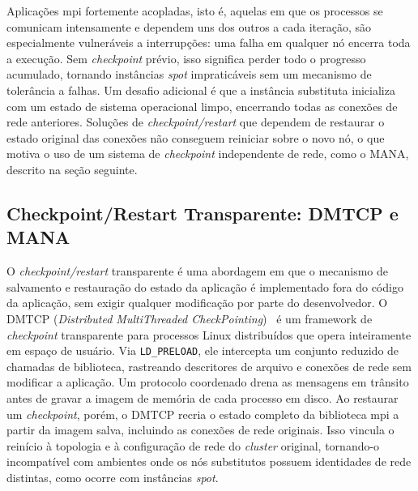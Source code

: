 \documentclass[a4paper,11pt]{article}
\begin{document}
            Aplicações \gls{mpi} fortemente acopladas, isto é, aquelas em que os processos
            se comunicam intensamente e dependem uns dos outros a cada iteração, são
            especialmente vulneráveis a interrupções: uma falha em qualquer nó encerra
            toda a execução. Sem \textit{checkpoint} prévio, isso significa perder todo
            o progresso acumulado, tornando instâncias \textit{spot} impraticáveis sem
            um mecanismo de tolerância a falhas. Um desafio adicional é que a instância
            substituta inicializa com um estado de sistema operacional limpo, encerrando
            todas as conexões de rede anteriores. Soluções de \textit{checkpoint/restart}
            que dependem de restaurar o estado original das conexões não conseguem
            reiniciar sobre o novo nó, o que motiva o uso de um sistema de
            \textit{checkpoint} independente de rede, como o MANA, descrito na
            seção seguinte.

        \subsection{Checkpoint/Restart Transparente: DMTCP e MANA}
        \label{sec:dmtcp-mana}

            O \textit{checkpoint/restart} transparente é uma abordagem em que o
            mecanismo de salvamento e restauração do estado da aplicação é implementado
            fora do código da aplicação, sem exigir qualquer modificação por parte do
            desenvolvedor. O DMTCP (\textit{Distributed MultiThreaded CheckPointing})~\cite{ansel2009dmtcp}
            é um framework de \textit{checkpoint} transparente para processos Linux
            distribuídos que opera inteiramente em espaço de usuário. Via \texttt{LD\_PRELOAD},
            ele intercepta um conjunto reduzido de chamadas de biblioteca, rastreando
            descritores de arquivo e conexões de rede sem modificar a aplicação.
            Um protocolo coordenado drena as mensagens em trânsito antes de gravar
            a imagem de memória de cada processo em disco.
            Ao restaurar um \textit{checkpoint}, porém, o DMTCP recria o estado completo
            da biblioteca \gls{mpi} a partir da imagem salva, incluindo as conexões de rede
            originais. Isso vincula o reinício à topologia e à configuração de rede do
            \textit{cluster} original, tornando-o incompatível com ambientes onde os
            nós substitutos possuem identidades de rede distintas, como ocorre com
            instâncias \textit{spot}.
\end{document}
